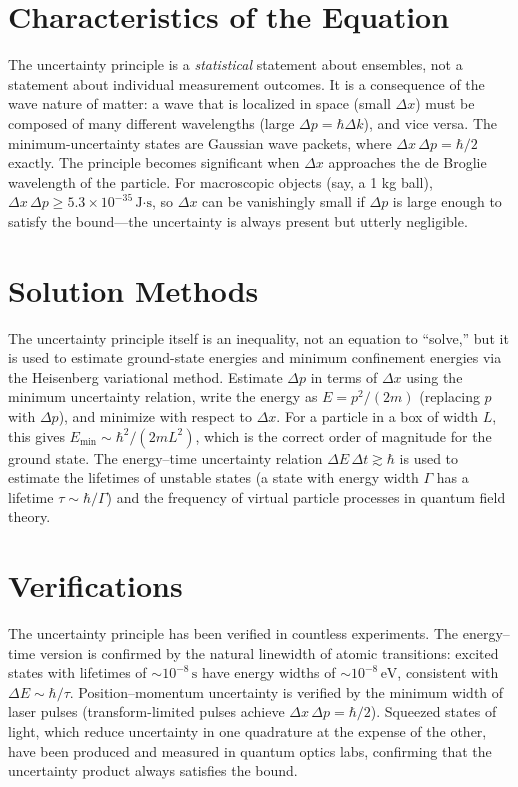 \documentclass[11pt,openright]{book}
\begin{document}
\section*{Characteristics of the Equation}

The uncertainty principle is a \emph{statistical} statement about ensembles, not a statement about individual measurement outcomes. It is a consequence of the wave nature of matter: a wave that is localized in space (small $\Delta x$) must be composed of many different wavelengths (large $\Delta p = \hbar\Delta k$), and vice versa. The minimum-uncertainty states are Gaussian wave packets, where $\Delta x\,\Delta p = \hbar/2$ exactly. The principle becomes significant when $\Delta x$ approaches the de Broglie wavelength of the particle. For macroscopic objects (say, a 1 kg ball), $\Delta x\,\Delta p \geq 5.3\times 10^{-35}\,\text{J·s}$, so $\Delta x$ can be vanishingly small if $\Delta p$ is large enough to satisfy the bound---the uncertainty is always present but utterly negligible.
\section*{Solution Methods}

The uncertainty principle itself is an inequality, not an equation to ``solve,'' but it is used to estimate ground-state energies and minimum confinement energies via the Heisenberg variational method. Estimate $\Delta p$ in terms of $\Delta x$ using the minimum uncertainty relation, write the energy as $E = p^2/(2m)$ (replacing $p$ with $\Delta p$), and minimize with respect to $\Delta x$. For a particle in a box of width $L$, this gives $E_{\text{min}} \sim \hbar^2/(2mL^2)$, which is the correct order of magnitude for the ground state. The energy--time uncertainty relation $\Delta E\,\Delta t \gtrsim \hbar$ is used to estimate the lifetimes of unstable states (a state with energy width $\Gamma$ has a lifetime $\tau \sim \hbar/\Gamma$) and the frequency of virtual particle processes in quantum field theory.
\section*{Verifications}

The uncertainty principle has been verified in countless experiments. The energy--time version is confirmed by the natural linewidth of atomic transitions: excited states with lifetimes of $\sim 10^{-8}\,\text{s}$ have energy widths of $\sim 10^{-8}\,\text{eV}$, consistent with $\Delta E \sim \hbar/\tau$. Position--momentum uncertainty is verified by the minimum width of laser pulses (transform-limited pulses achieve $\Delta x\,\Delta p = \hbar/2$). Squeezed states of light, which reduce uncertainty in one quadrature at the expense of the other, have been produced and measured in quantum optics labs, confirming that the uncertainty product always satisfies the bound.
\end{document}
